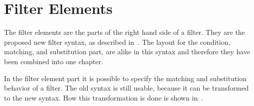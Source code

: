 \chapter{Filter Elements} \label{chapter:newfilterelement}
The filter elements are the parts of the right hand side of a filter. They are the proposed
new filter syntax, as described in~\cite{Doornenbal2006}.
The layout for the condition, matching, and substitution part, are alike in this syntax and therefore they
have been combined into one chapter.

In the filter element part it is possible to specify the matching and substitution behavior of a filter.
The old syntax is still usable, because it can be transformed to the new syntax. How this transformation is
done is shown in~\cite{Doornenbal2006}.


